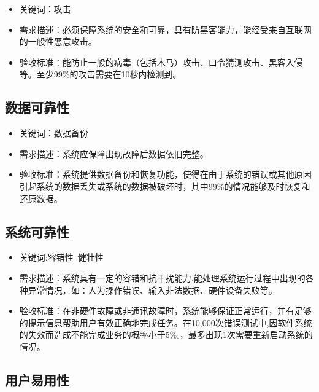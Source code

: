 \documentclass[hyperref, a4paper]{ctexart}
\providecommand{\tightlist}{%
  \setlength{\itemsep}{0pt}\setlength{\parskip}{0pt}}
\begin{document}
\begin{itemize}
\tightlist
\item
  关键词：攻击
\item
  需求描述：必须保障系统的安全和可靠，具有防黑客能力，能经受来自互联网的一般性恶意攻击。
\item
  验收标准：能防止一般的病毒（包括木马）攻击、口令猜测攻击、黑客入侵等。至少99\%的攻击需要在10秒内检测到。
\end{itemize}

\hypertarget{ux6570ux636eux53efux9760ux6027}{%
\subsection{数据可靠性}\label{ux6570ux636eux53efux9760ux6027}}

\begin{itemize}
\tightlist
\item
  关键词：数据备份
\item
  需求描述：系统应保障出现故障后数据依旧完整。
\item
  验收标准：系统提供数据备份和恢复功能，使得在由于系统的错误或其他原因引起系统的数据丢失或系统的数据被破坏时，其中99\%的情况能够及时恢复和还原数据。
\end{itemize}

\hypertarget{ux7cfbux7edfux53efux9760ux6027}{%
\subsection{系统可靠性}\label{ux7cfbux7edfux53efux9760ux6027}}

\begin{itemize}
\tightlist
\item
  关键词:容错性~健壮性
\item
  需求描述：系统具有一定的容错和抗干扰能力,能处理系统运行过程中出现的各种异常情况，如：人为操作错误、输入非法数据、硬件设备失败等。
\item
  验收标准：在非硬件故障或非通讯故障时，系统能够保证正常运行，并有足够的提示信息帮助用户有效正确地完成任务。在10,000次错误测试中,因软件系统的失效而造成不能完成业务的概率小于5‰，最多出现1次需要重新启动系统的情况。
\end{itemize}

\hypertarget{ux7528ux6237ux6613ux7528ux6027}{%
\subsection{用户易用性}\label{ux7528ux6237ux6613ux7528ux6027}}
\end{document}
